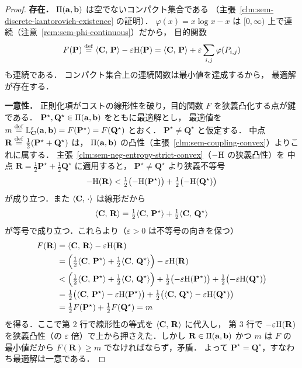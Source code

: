 \begin{proof}
  \textbf{存在．}
  $\Pi(\mathbf{a}, \mathbf{b})$ は空でないコンパクト集合である
  （主張~\ref{clm:sem-discrete-kantorovich-existence} の証明）．
  $\varphi(x) = x\log x - x$ は $[0,\infty)$ 上で連続（注意~\ref{rem:sem-phi-continuous}）だから，
  目的関数
  \[
    F(\mathbf{P})
    \overset{\mathrm{def}}{=}
    \langle \mathbf{C},\, \mathbf{P} \rangle - \varepsilon \mathrm{H}(\mathbf{P})
    =
    \langle \mathbf{C},\, \mathbf{P} \rangle
    + \varepsilon \sum_{i,j} \varphi(P_{i,j})
  \]
  も連続である．
  コンパクト集合上の連続関数は最小値を達成するから，
  最適解が存在する．

  \textbf{一意性．}
  正則化項がコストの線形性を破り，目的関数 $F$ を狭義凸化する点が鍵である．
  $\mathbf{P}^\star, \mathbf{Q}^\star \in \Pi(\mathbf{a}, \mathbf{b})$ をともに最適解とし，
  最適値を $m \overset{\mathrm{def}}{=} \mathrm{L}_{\mathbf{C}}^\varepsilon(\mathbf{a}, \mathbf{b}) = F(\mathbf{P}^\star) = F(\mathbf{Q}^\star)$ とおく．
  $\mathbf{P}^\star \neq \mathbf{Q}^\star$ と仮定する．
  中点 $\mathbf{R} \overset{\mathrm{def}}{=} \tfrac{1}{2}(\mathbf{P}^\star + \mathbf{Q}^\star)$ は，
  $\Pi(\mathbf{a}, \mathbf{b})$ の凸性（主張~\ref{clm:sem-coupling-convex}）よりこれに属する．
  主張~\ref{clm:sem-neg-entropy-strict-convex}（$-\mathrm{H}$ の狭義凸性）を
  中点 $\mathbf{R} = \tfrac{1}{2}\mathbf{P}^\star + \tfrac{1}{2}\mathbf{Q}^\star$ に適用すると，
  $\mathbf{P}^\star \neq \mathbf{Q}^\star$ より狭義不等号
  \[
    -\mathrm{H}(\mathbf{R})
    < \tfrac{1}{2}\bigl(-\mathrm{H}(\mathbf{P}^\star)\bigr) + \tfrac{1}{2}\bigl(-\mathrm{H}(\mathbf{Q}^\star)\bigr)
  \]
  が成り立つ．また $\langle \mathbf{C},\, \cdot \rangle$ は線形だから
  \[
    \langle \mathbf{C},\, \mathbf{R} \rangle
    = \tfrac{1}{2}\langle \mathbf{C},\, \mathbf{P}^\star \rangle + \tfrac{1}{2}\langle \mathbf{C},\, \mathbf{Q}^\star \rangle
  \]
  が等号で成り立つ．これらより（$\varepsilon > 0$ は不等号の向きを保つ）
  \begin{align*}
    F(\mathbf{R})
    &= \langle \mathbf{C},\, \mathbf{R} \rangle - \varepsilon\mathrm{H}(\mathbf{R}) \\
    &= \Bigl(\tfrac{1}{2}\langle \mathbf{C},\, \mathbf{P}^\star \rangle + \tfrac{1}{2}\langle \mathbf{C},\, \mathbf{Q}^\star \rangle\Bigr)
       - \varepsilon\mathrm{H}(\mathbf{R}) \\
    &< \Bigl(\tfrac{1}{2}\langle \mathbf{C},\, \mathbf{P}^\star \rangle + \tfrac{1}{2}\langle \mathbf{C},\, \mathbf{Q}^\star \rangle\Bigr)
       + \tfrac{1}{2}\bigl(-\varepsilon\mathrm{H}(\mathbf{P}^\star)\bigr)
       + \tfrac{1}{2}\bigl(-\varepsilon\mathrm{H}(\mathbf{Q}^\star)\bigr) \\
    &= \tfrac{1}{2}\bigl(\langle \mathbf{C},\, \mathbf{P}^\star \rangle - \varepsilon\mathrm{H}(\mathbf{P}^\star)\bigr)
       + \tfrac{1}{2}\bigl(\langle \mathbf{C},\, \mathbf{Q}^\star \rangle - \varepsilon\mathrm{H}(\mathbf{Q}^\star)\bigr) \\
    &= \tfrac{1}{2}F(\mathbf{P}^\star) + \tfrac{1}{2}F(\mathbf{Q}^\star) = m
  \end{align*}
  を得る．ここで第 2 行で線形性の等式を $\langle \mathbf{C},\, \mathbf{R} \rangle$ に代入し，
  第 3 行で $-\varepsilon\mathrm{H}(\mathbf{R})$ を狭義凸性（の $\varepsilon$ 倍）で上から押さえた．しかし $\mathbf{R} \in \Pi(\mathbf{a}, \mathbf{b})$ かつ $m$ は $F$ の最小値だから
  $F(\mathbf{R}) \geq m$ でなければならず，矛盾．
  よって $\mathbf{P}^\star = \mathbf{Q}^\star$，すなわち最適解は一意である．
\end{proof}

